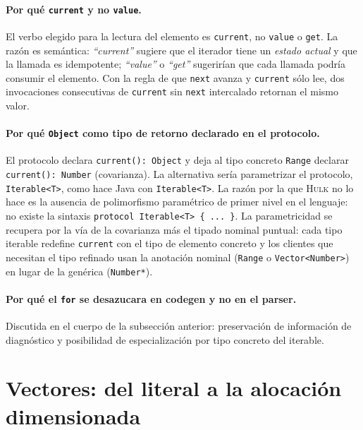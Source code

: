 \documentclass[11pt,a4paper,oneside,openany]{report}
\newcommand{\hulk}{\textsc{Hulk}}
\newcommand{\code}[1]{\texttt{#1}}
\begin{document}
\paragraph{Por qué \code{current} y no \code{value}.}
El verbo elegido para la lectura del elemento es \code{current}, no
\code{value} o \code{get}. La razón es semántica: \emph{``current''}
sugiere que el iterador tiene un \emph{estado actual} y que la llamada es
idempotente; \emph{``value''} o \emph{``get''} sugerirían que cada llamada
podría consumir el elemento. Con la regla de que \code{next} avanza y
\code{current} sólo lee, dos invocaciones consecutivas de \code{current}
sin \code{next} intercalado retornan el mismo valor.

\paragraph{Por qué \code{Object} como tipo de retorno declarado en el
protocolo.}
El protocolo declara \code{current(): Object} y deja al tipo concreto
\code{Range} declarar \code{current(): Number} (covarianza). La alternativa
sería parametrizar el protocolo, \code{Iterable<T>}, como hace Java con
\code{Iterable<T>}. La razón por la que \hulk{} no lo hace es la ausencia
de polimorfismo paramétrico de primer nivel en el lenguaje: no existe la
sintaxis \code{protocol Iterable<T> \{ ... \}}. La parametricidad se
recupera por la vía de la covarianza más el tipado nominal puntual: cada
tipo iterable redefine \code{current} con el tipo de elemento concreto y
los clientes que necesitan el tipo refinado usan la anotación nominal
(\code{Range} o \code{Vector<Number>}) en lugar de la genérica
(\code{Number*}).

\paragraph{Por qué el \code{for} se desazucara en codegen y no en el parser.}
Discutida en el cuerpo de la subsección anterior: preservación de
información de diagnóstico y posibilidad de especialización por tipo
concreto del iterable.

\section{Vectores: del literal a la alocación dimensionada}
\label{sec:ext-vec}
\end{document}
